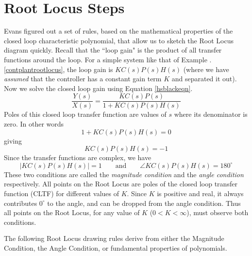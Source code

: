 






\section{Root Locus Steps}

Evans figured out a set of rules, based on the mathematical properties of the closed loop characteristic polynomial, that allow us to sketch the Root Locus diagram quickly.
Recall that the ``loop gain" is the product of all transfer functions around the loop.  For a simple system like that of Example \thechapter.\ref{contplantrootlocus}, the loop gain is $KC(s)P(s)H(s)$ (where we have {\it assumed} that the controller has a constant gain term $K$ and separated it out).  Now we solve the closed loop gain using Equation \ref{hsblackeqn}.
\[
\frac{Y(s)}{X(s)} = \frac  {KC(s)P(s)}   {1+KC(s)P(s)H(s)}
\]
Poles of this closed loop transfer function are values of $s$ where its denominator is zero.  In other words
\[
 {1+KC(s)P(s)H(s)} = 0
\]
giving
\[
{KC(s)P(s)H(s)} = -1
\]
Since the transfer functions are complex, we have
\[
\left | KC(s)P(s)H(s)\right | = 1 \qquad \mathrm{and} \qquad \angle KC(s)P(s)H(s) = 180^\circ
\]
These two conditions are called the {\it magnitude condition} and the {\it angle condition} respectively.
All points on the Root Locus are poles of the closed loop transfer function (CLTF) for different values of $K$.  Since $K$ is positive and real, it always contributes $0^\circ$ to the angle, and can be dropped from the angle condition.  Thus all points on the Root Locus, for any value of $K$ ($0<K<\infty$), must observe both conditions.

The following Root Locus drawing rules derive from either the Magnitude Condition, the Angle Condition, or fundamental properties of polynomials.



